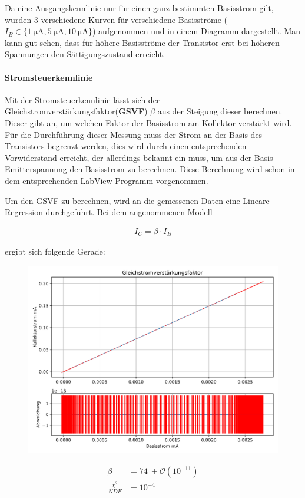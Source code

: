 \documentclass[12pt,twoside,a4paper]{scrartcl}
\begin{document}
            Da eine Ausgangskennlinie nur für einen ganz bestimmten Basisstrom gilt, wurden 3 verschiedene Kurven für verschiedene Basisströme ($I_B \in \{ \SI{1}{\micro \ampere}, \SI{5}{\micro \ampere}, \SI{10}{\micro \ampere} \}$) aufgenommen und in einem Diagramm dargestellt. Man kann gut sehen, dass für höhere Basisströme der Transistor erst bei höheren Spannungen den Sättigungszustand erreicht.


    \paragraph{Stromsteuerkennlinie}

        Mit der Stromsteuerkennlinie lässt sich der Gleichstromverstärkungsfaktor(\textbf{GSVF}) $\beta$ aus der Steigung dieser berechnen. Dieser gibt an, um welchen Faktor der Basisstrom am Kollektor verstärkt wird.
        Für die Durchführung dieser Messung muss der Strom an der Basis des Transistors begrenzt werden, dies wird durch einen entsprechenden Vorwiderstand erreicht, der allerdings bekannt ein muss, um aus der Basis-Emitterspannung den Basisstrom zu berechnen. Diese Berechnung wird schon in dem entsprechenden LabView Programm vorgenommen.

        Um den GSVF zu berechnen, wird an die gemessenen Daten eine Lineare Regression durchgeführt. Bei dem angenommenen Modell

        \begin{align*}
            I_C = \beta \cdot I_B
        \end{align*}

        ergibt sich folgende Gerade:

        \begin{figure}[H]
            \begin{minipage}{0.69 \textwidth}
                \includegraphics[width = 0.8 \textwidth]{Plots/Transistor/gsvf}
            \end{minipage}
            \begin{minipage}{0.29 \textwidth}
                \begin{align*}
                    \beta &= \SI{74}{} \pm \mathcal{O}(10^{-11}) \\
                    \frac{\chi^2}{NDF} &= 10^{-4}
                \end{align*}
            \end{minipage}
        \end{figure}
\end{document}
